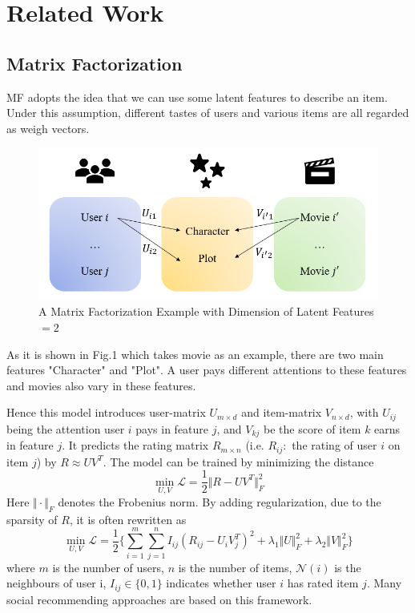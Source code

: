 \documentclass{article}
\begin{document}
\section{Related Work}
\label{related_work}

\subsection{Matrix Factorization}

MF adopts the idea that we can use some latent features to 
describe an item. Under this assumption, different tastes of users 
and various items are all regarded as weigh vectors. 
\begin{figure}[h]
  \centering
  \includegraphics[scale=0.4]{pic/figure1.png}
  \caption{A Matrix Factorization Example with Dimension of Latent Features $=2$}
\end{figure} 

As it is shown in Fig.1 which takes movie as an example, 
there are two main features "Character" and "Plot". A user
pays different attentions to these features and movies also vary in these features. 

Hence this model introduces user-matrix $U_{m \times d}$ and item-matrix $V_{n \times d}$, with 
$U_{ij}$ being the attention user $i$ pays in feature $j$, and $V_{kj}$ be the score of item $k$ 
earns in feature $j$. It predicts the rating matrix $R_{m \times n}$ (i.e. $R_{ij}: $ the rating of user $i$ on item $j$) 
by $R \approx U V^T$. The model can be trained by minimizing the distance
$$ \min_{U, V} \mathcal{L} = \frac{1}{2} \Vert R - UV^T \Vert_F^2 $$
Here $\Vert \cdot \Vert_F$ denotes the Frobenius norm. 
By adding regularization, due to the sparsity of $R$, it is often rewritten as
\begin{equation}
  \min_{U, V} \mathcal{L} = \frac{1}{2} \{\sum_{i=1}^m \sum_{j=1}^n I_{ij} (R_{ij} - U_iV_j^T)^2 + \lambda_1 \Vert U \Vert_F^2 + \lambda_2 \Vert V \Vert_F^2 \}
\end{equation} 
where $m$ is the number of users, $n$ is the number of items, $\mathcal{N}(i)$ is 
the neighbours of user i, $I_{ij} \in \{0, 1\}$ indicates whether user $i$ has rated item $j$. 
Many social recommending approaches \cite{ma2011rsr, jam2010trust, ma2009rste} are based on this framework.
\end{document}
